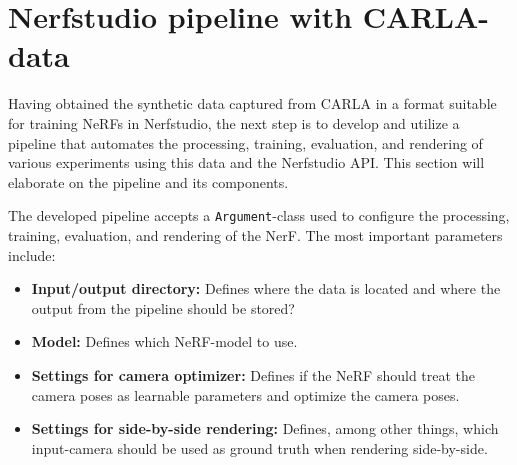 \section{Nerfstudio pipeline with CARLA-data} \label{sec:nerfstudio-pipeline}
\begin{comment}
Premise: Have data in a Nerfstudio format, collected from CARLA.
Question: How can I train a NeRF that represent the same scene?

\begin{itemize}
    \item Explain the Nerfstudio API and the created pipeline. Train, eval, render
    \item Go into detail on e.g. the train/eval-split, training parameters, etc. Add additional info to the appendix.
\end{itemize}
\end{comment}





Having obtained the synthetic data captured from CARLA in a format suitable for training NeRFs in Nerfstudio, the next step is to develop and utilize a pipeline that automates the processing, training, evaluation, and rendering of various experiments using this data and the Nerfstudio API. This section will elaborate on the pipeline and its components.

The developed pipeline accepts a \texttt{Argument}-class used to configure the processing, training, evaluation, and rendering of the NerF. The most important parameters include:

\begin{itemize}
    \item \textbf{Input/output directory:} Defines where the data is located and where the output from the pipeline should be stored?
    \item \textbf{Model:} Defines which NeRF-model to use.
    \item \textbf{Settings for camera optimizer:} Defines if the NeRF should treat the camera poses as learnable parameters and optimize the camera poses.
    \item \textbf{Settings for side-by-side rendering:} Defines, among other things, which input-camera should be used as ground truth when rendering side-by-side.
\end{itemize}

